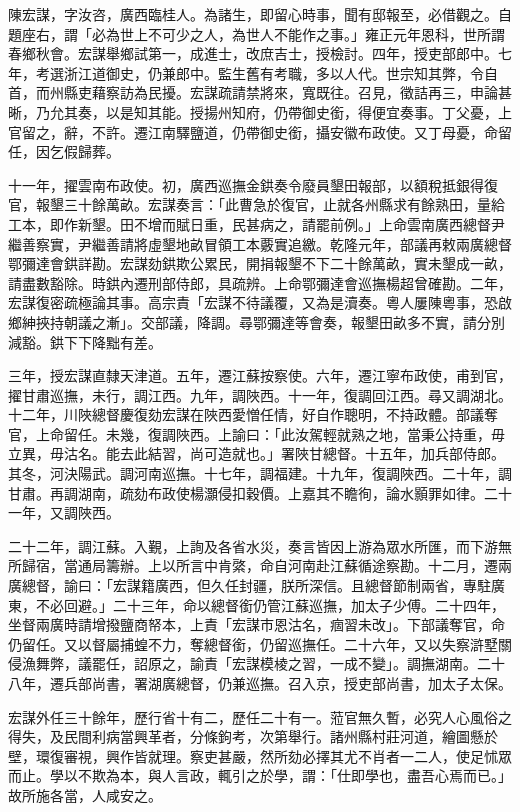 \begin{pinyinscope}
陳宏謀，字汝咨，廣西臨桂人。為諸生，即留心時事，聞有邸報至，必借觀之。自題座右，謂「必為世上不可少之人，為世人不能作之事。」雍正元年恩科，世所謂春鄉秋會。宏謀舉鄉試第一，成進士，改庶吉士，授檢討。四年，授吏部郎中。七年，考選浙江道御史，仍兼郎中。監生舊有考職，多以人代。世宗知其弊，令自首，而州縣吏藉察訪為民擾。宏謀疏請禁將來，寬既往。召見，徵詰再三，申論甚晰，乃允其奏，以是知其能。授揚州知府，仍帶御史銜，得便宜奏事。丁父憂，上官留之，辭，不許。遷江南驛鹽道，仍帶御史銜，攝安徽布政使。又丁母憂，命留任，因乞假歸葬。

十一年，擢雲南布政使。初，廣西巡撫金鉷奏令廢員墾田報部，以額稅抵銀得復官，報墾三十餘萬畝。宏謀奏言：「此曹急於復官，止就各州縣求有餘熟田，量給工本，即作新墾。田不增而賦日重，民甚病之，請罷前例。」上命雲南廣西總督尹繼善察實，尹繼善請將虛墾地畝冒領工本覈實追繳。乾隆元年，部議再敕兩廣總督鄂彌達會鉷詳勘。宏謀劾鉷欺公累民，開捐報墾不下二十餘萬畝，實未墾成一畝，請盡數豁除。時鉷內遷刑部侍郎，具疏辨。上命鄂彌達會巡撫楊超曾確勘。二年，宏謀復密疏極論其事。高宗責「宏謀不待議覆，又為是瀆奏。粵人屢陳粵事，恐啟鄉紳挾持朝議之漸」。交部議，降調。尋鄂彌達等會奏，報墾田畝多不實，請分別減豁。鉷下下降黜有差。

三年，授宏謀直隸天津道。五年，遷江蘇按察使。六年，遷江寧布政使，甫到官，擢甘肅巡撫，未行，調江西。九年，調陜西。十一年，復調回江西。尋又調湖北。十二年，川陜總督慶復劾宏謀在陜西愛憎任情，好自作聰明，不持政體。部議奪官，上命留任。未幾，復調陜西。上諭曰：「此汝駕輕就熟之地，當秉公持重，毋立異，毋沽名。能去此結習，尚可造就也。」署陜甘總督。十五年，加兵部侍郎。其冬，河決陽武。調河南巡撫。十七年，調福建。十九年，復調陜西。二十年，調甘肅。再調湖南，疏劾布政使楊灝侵扣穀價。上嘉其不瞻徇，論水顥罪如律。二十一年，又調陜西。

二十二年，調江蘇。入覲，上詢及各省水災，奏言皆因上游為眾水所匯，而下游無所歸宿，當通局籌辦。上以所言中肯綮，命自河南赴江蘇循途察勘。十二月，遷兩廣總督，諭曰：「宏謀籍廣西，但久任封疆，朕所深信。且總督節制兩省，專駐廣東，不必回避。」二十三年，命以總督銜仍管江蘇巡撫，加太子少傅。二十四年，坐督兩廣時請增撥鹽商帑本，上責「宏謀巿恩沽名，痼習未改」。下部議奪官，命仍留任。又以督屬捕蝗不力，奪總督銜，仍留巡撫任。二十六年，又以失察滸墅關侵漁舞弊，議罷任，詔原之，諭責「宏謀模棱之習，一成不變」。調撫湖南。二十八年，遷兵部尚書，署湖廣總督，仍兼巡撫。召入京，授吏部尚書，加太子太保。

宏謀外任三十餘年，歷行省十有二，歷任二十有一。蒞官無久暫，必究人心風俗之得失，及民間利病當興革者，分條鉤考，次第舉行。諸州縣村莊河道，繪圖懸於壁，環復審視，興作皆就理。察吏甚嚴，然所劾必擇其尤不肖者一二人，使足怵眾而止。學以不欺為本，與人言政，輒引之於學，謂：「仕即學也，盡吾心焉而已。」故所施各當，人咸安之。


\end{pinyinscope}
